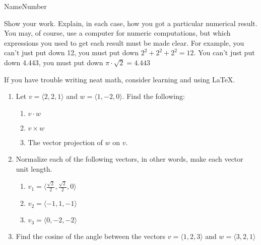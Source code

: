 \documentclass{article}
\newcommand{\vect}[1]{\langle #1 \rangle}
\begin{document}
\bigskip

\noindent Name\hrulefill Number \hrulefill

Show your work.  Explain, in each case, how you got a particular
numerical result.  You may, of course, use a computer for numeric
computations, but which expressions you used to get each result must
be made clear.  For example, you can't just put down 12, you must put
down $2^2 + 2^2 + 2^2 = 12$.  You can't just put down 4.443, you
must put down $\pi\cdot\sqrt{2} = 4.443$

If you have trouble writing neat math, consider learning and using \LaTeX.

\begin{enumerate}
\item Let $v=\vect{2,2,1}$ and $w=\vect{1,-2,0}$.  Find the following:
  \begin{enumerate}
  \item $v\cdot w$
\vfill
  \item $v\times w$
\vfill
  \item The vector projection of $w$ on $v$.
\vfill
  \end{enumerate}

\item Normalize each of the following vectors, in other words, make
  each vector unit length.
  \begin{enumerate}
  \item $v_1 = \vect{\frac{\sqrt{2}}{2}, \frac{\sqrt{2}}{2}, 0}$
\vfill
  \item $v_2 = \vect{-1,1,-1}$
\vfill
  \item $v_3 = \vect{0,-2,-2}$
\vfill
  \end{enumerate}

\item Find the cosine of the angle between the vectors
  $v=\vect{1,2,3}$ and $w=\vect{3,2,1}$
\vfill


\end{enumerate}
\end{document}
